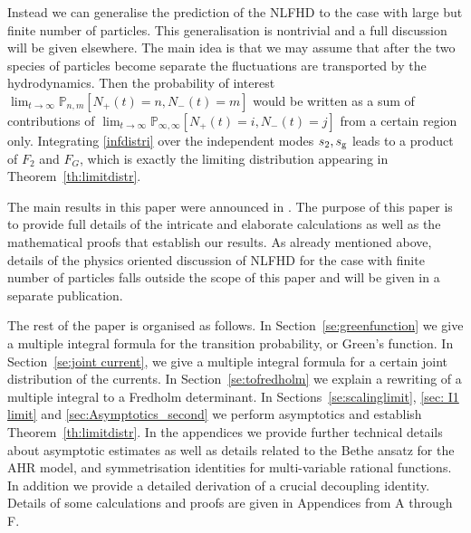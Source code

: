 \documentclass[cmp]{svjour}
\numberwithin{theorem}{section}
\numberwithin{equation}{section}
\begin{document}
Instead we can generalise the prediction of the NLFHD to the case with large but finite number of particles. This generalisation is nontrivial and a full discussion will be given elsewhere.
 The main idea is that we may assume that after the two species of particles become separate the fluctuations are transported by the hydrodynamics. Then the probability of interest $\lim_{t\to\infty} \mathbb{P}_{n,m}[N_+(t)=n,N_-(t)=m]$ would be written as a sum of contributions of $\lim_{t\to\infty} \mathbb{P}_{\infty,\infty}[N_+(t)=i,N_-(t)=j]$ from a certain region only. Integrating \eqref{infdistri} over the independent modes $s_2,s_{\rm g}$ leads to a product of $F_2$ and $F_G$, which is exactly the limiting distribution appearing in Theorem~\ref{th:limitdistr}.

The main results in this paper were announced in \cite{PRL}. The purpose of this paper is to provide full details of the intricate and elaborate calculations as well as the mathematical proofs that establish our results. As already mentioned above, details of the physics oriented discussion of NLFHD for the case with finite number of particles falls outside the scope of this paper and will be given in a separate publication. 

The rest of the paper is organised as follows. In Section~\ref{se:greenfunction} we give a multiple integral formula for the transition probability, or Green's function. In Section~\ref{se:joint current}, we give a multiple integral formula for a certain joint distribution of the currents.
In Section~\ref{se:tofredholm} we explain a rewriting of a multiple integral to a Fredholm determinant. In Sections~\ref{se:scalinglimit}, \ref{sec: I1 limit} and \ref{sec:Asymptotics_second} we perform asymptotics and establish Theorem~\ref{th:limitdistr}. In the appendices we provide further technical details about asymptotic estimates as well as details related to the Bethe ansatz for the AHR model, and symmetrisation identities for multi-variable rational functions. In addition we provide a detailed derivation of a crucial decoupling identity. Details of some calculations and proofs are given in  Appendices from A through F.
\end{document}
